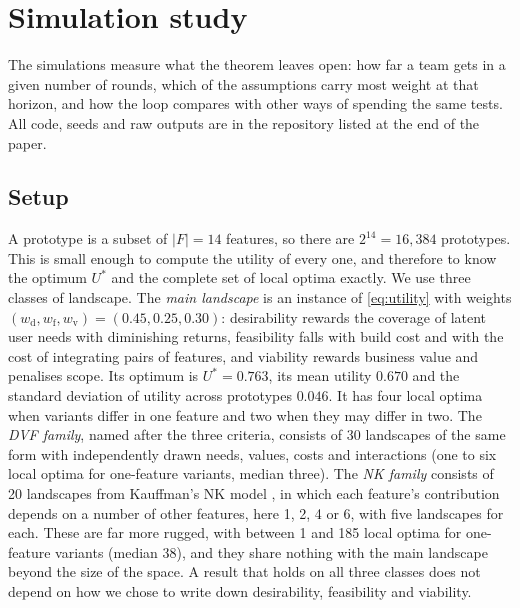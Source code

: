 \documentclass[10pt,twocolumn]{article}
\theoremstyle{definition}
\begin{document}
\section{Simulation study}
\label{sec:sim}

The simulations measure what the theorem leaves open: how far a team gets in a given number of rounds, which of the assumptions carry most weight at that horizon, and how the loop compares with other ways of spending the same tests. All code, seeds and raw outputs are in the repository listed at the end of the paper.

\subsection{Setup}
\label{sec:setup}

A prototype is a subset of $|F|=14$ features, so there are $2^{14}=16{,}384$ prototypes. This is small enough to compute the utility of every one, and therefore to know the optimum $U^*$ and the complete set of local optima exactly. We use three classes of landscape. The \emph{main landscape} is an instance of \eqref{eq:utility} with weights $(w_{\mathrm d},w_{\mathrm f},w_{\mathrm v})=(0.45,0.25,0.30)$: desirability rewards the coverage of latent user needs with diminishing returns, feasibility falls with build cost and with the cost of integrating pairs of features, and viability rewards business value and penalises scope. Its optimum is $U^*=0.763$, its mean utility $0.670$ and the standard deviation of utility across prototypes $0.046$. It has four local optima when variants differ in one feature and two when they may differ in two. The \emph{DVF family}, named after the three criteria, consists of 30 landscapes of the same form with independently drawn needs, values, costs and interactions (one to six local optima for one-feature variants, median three). The \emph{NK family} consists of 20 landscapes from Kauffman's NK model \citep{kauffman1993}, in which each feature's contribution depends on a number of other features, here 1, 2, 4 or 6, with five landscapes for each. These are far more rugged, with between 1 and 185 local optima for one-feature variants (median 38), and they share nothing with the main landscape beyond the size of the space. A result that holds on all three classes does not depend on how we chose to write down desirability, feasibility and viability.
\end{document}

